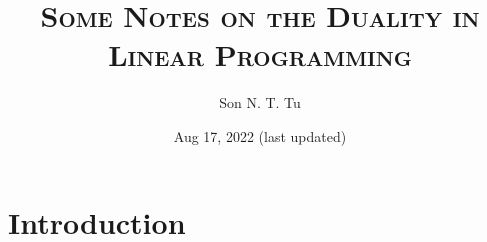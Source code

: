 \documentclass[12pt,oneside,reqno]{amsart}
\title{\textsc{Some Notes on the Duality in Linear Programming}}
\author{Son N. T. Tu}
\date{Aug 17, 2022 (last updated)}
\theoremstyle{plain}
\theoremstyle{remark}
\begin{document}
\maketitle

\section{Introduction}

\clearpage 





{}

\end{document}
